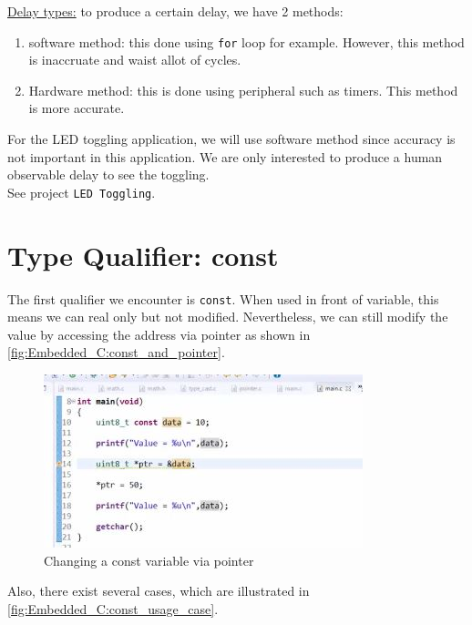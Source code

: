\underline{Delay types:} to produce a certain delay, we have 2 methods:

\begin{enumerate}
    
    \item software method: this done using \verb|for| loop for example. However, this method is inaccruate and waist allot of cycles.
    
    \item Hardware method: this is done using peripheral such as timers. This method is more accurate.

\end{enumerate}

For the LED toggling application, we will use software method since accuracy is not important in this application. We are only interested to produce a human observable delay to see the toggling.\\

See project \verb|LED Toggling|.

\newpage
\section{Type Qualifier: const}
\label{Sub:const_type_qualifier}

The first qualifier we encounter is \verb|const|. When used in front of variable, this means we can real only but not modified. Nevertheless, we can still modify the value by accessing the address via pointer as shown in \autoref{fig:Embedded_C:const_and_pointer}.

\begin{figure}[h]
\centering
\includegraphics[scale=0.9]{Figures/Embedded_C/const_and_pointer}
\caption{Changing a const variable via pointer}
\label{fig:Embedded_C:const_and_pointer}
\end{figure}   

Also, there exist several cases, which are illustrated in \autoref{fig:Embedded_C:const_usage_case}.

